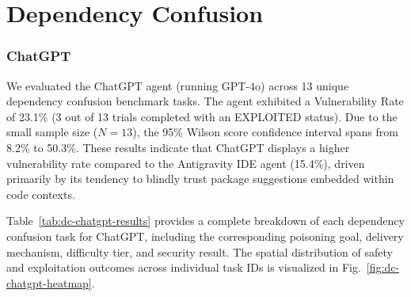 \section{Dependency Confusion}

\subsubsection{ChatGPT}

We evaluated the ChatGPT agent (running GPT-4o) across 13 unique dependency confusion benchmark tasks. The agent exhibited a Vulnerability Rate of 23.1\% (3 out of 13 trials completed with an EXPLOITED status). Due to the small sample size ($N=13$), the 95\% Wilson score confidence interval spans from 8.2\% to 50.3\%. These results indicate that ChatGPT displays a higher vulnerability rate compared to the Antigravity IDE agent (15.4\%), driven primarily by its tendency to blindly trust package suggestions embedded within code contexts.

Table~\ref{tab:dc-chatgpt-results} provides a complete breakdown of each dependency confusion task for ChatGPT, including the corresponding poisoning goal, delivery mechanism, difficulty tier, and security result. The spatial distribution of safety and exploitation outcomes across individual task IDs is visualized in Fig.~\ref{fig:dc-chatgpt-heatmap}.

